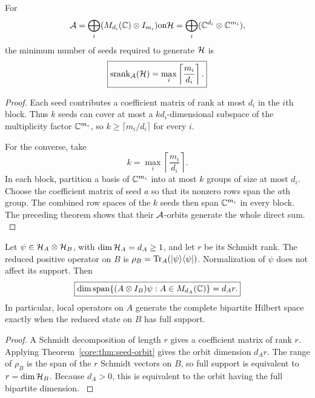 \begin{theorem}\label{core:theorem:002}\label{core:thm:seed-rank}
For
\[
\cA=\bigoplus_i(M_{d_i}(\bbC)\otimes I_{m_i})
\quad\text{on}\quad
\cH=\bigoplus_i(\bbC^{d_i}\otimes\bbC^{m_i}),
\]
the minimum number of seeds required to generate $\cH$ is
\[
\boxed{
\operatorname{srank}_{\cA}(\cH)
=
\max_i\left\lceil\frac{m_i}{d_i}\right\rceil.
}
\]
\end{theorem}

\begin{proof}\label{core:proof:002}
Each seed contributes a coefficient matrix of rank at most $d_i$ in the $i$th block. Thus $k$ seeds can cover at most a $kd_i$-dimensional subspace of the multiplicity factor $\bbC^{m_i}$, so $k\ge\lceil m_i/d_i\rceil$ for every $i$.

For the converse, take
\[
k=\max_i\left\lceil\frac{m_i}{d_i}\right\rceil.
\]
In each block, partition a basis of $\bbC^{m_i}$ into at most $k$ groups of size at most $d_i$. Choose the coefficient matrix of seed $a$ so that its nonzero rows span the $a$th group. The combined row spaces of the $k$ seeds then span $\bbC^{m_i}$ in every block. The preceding theorem shows that their $\cA$-orbits generate the whole direct sum.
\label{core:proof:002:end}\end{proof}

\begin{corollary}\label{core:corollary:001}\label{core:thm:schmidt}
Let $\psi\in\cH_A\otimes\cH_B$, with $\dim\cH_A=d_A\ge1$, and let $r$ be its Schmidt rank. The reduced positive operator on $B$ is $\rho_B=\operatorname{Tr}_A(\lvert \psi\rangle\langle \psi\rvert)$. Normalization of $\psi$ does not affect its support. Then
\[
\boxed{
\dim\operatorname{span}\{(A\otimes I_B)\psi:A\in M_{d_A}(\bbC)\}
=d_A r.
}
\]
In particular, local operators on $A$ generate the complete bipartite Hilbert space exactly when the reduced state on $B$ has full support.
\end{corollary}

\begin{proof}\label{core:proof:003}
A Schmidt decomposition of length $r$ gives a coefficient matrix of rank $r$. Applying Theorem~\ref{core:thm:seed-orbit} gives the orbit dimension $d_A r$. The range of $\rho_B$ is the span of the $r$ Schmidt vectors on $B$, so full support is equivalent to $r=\dim\cH_B$. Because $d_A>0$, this is equivalent to the orbit having the full bipartite dimension.
\label{core:proof:003:end}\end{proof}

